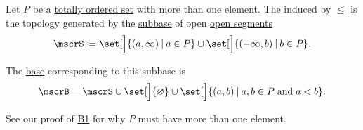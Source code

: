 \begin{definition}\label{def:order_topology}
  Let \( P \) be a \hyperref[def:partially_ordered_set]{totally ordered set} with more than one element. The  induced by \( \leq \) is the topology generated by the \hyperref[def:topological_subbase]{subbase} of open \hyperref[def:order_interval/unbounded]{open segments}
  \begin{equation}\label{eq:def:order_topology/subbase}
    \mscrS \coloneqq \set[\Big]{ (a, \infty) \given a \in P } \cup \set[\Big]{ (-\infty, b) \given b \in P }.
  \end{equation}

  The \hyperref[def:topological_base]{base} corresponding to this subbase is
  \begin{equation}\label{eq:def:order_topology/base}
    \mscrB = \mscrS \cup \set[\Big]{ \varnothing } \cup \set[\Big]{ (a, b) \given a, b \in P \T{and} a < b }.
  \end{equation}

  See our proof of \hyperref[thm:topology_from_base/B1]{B1} for why \( P \) must have more than one element.
\end{definition}

